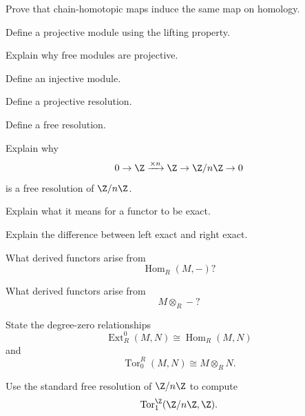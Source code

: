 \begin{exercise}[3]
Prove that chain-homotopic maps induce the same map on homology.
\end{exercise}

\begin{exercise}[1]
Define a projective module using the lifting property.
\end{exercise}

\begin{exercise}[2]
Explain why free modules are projective.
\end{exercise}

\begin{exercise}[1]
Define an injective module.
\end{exercise}

\begin{exercise}[1]
Define a projective resolution.
\end{exercise}

\begin{exercise}[1]
Define a free resolution.
\end{exercise}

\begin{exercise}[2]
Explain why
\[ 0\to\Z\xrightarrow{\times n}\Z\to\Z/n\Z\to0 \]
is a free resolution of \(\Z/n\Z\).
\end{exercise}

\begin{exercise}[1]
Explain what it means for a functor to be exact.
\end{exercise}

\begin{exercise}[1]
Explain the difference between left exact and right exact.
\end{exercise}

\begin{exercise}[1]
What derived functors arise from
\[ \operatorname{Hom}_R(M,-)? \]
\end{exercise}

\begin{exercise}[1]
What derived functors arise from
\[ M\otimes_R-? \]
\end{exercise}

\begin{exercise}[1]
State the degree-zero relationships
\[ \operatorname{Ext}_R^0(M,N)\cong\operatorname{Hom}_R(M,N) \]
and
\[ \operatorname{Tor}_0^R(M,N)\cong M\otimes_RN. \]
\end{exercise}

\begin{exercise}[2]
Use the standard free resolution of \(\Z/n\Z\) to compute
\[ \operatorname{Tor}_1^\Z(\Z/n\Z,\Z). \]
\end{exercise}

